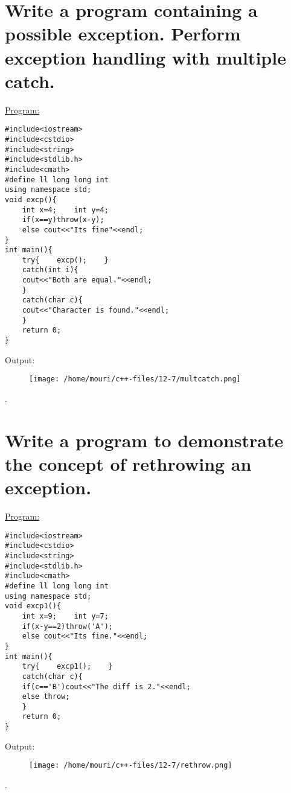 \documentclass[a4paper,11pt]{article}
\begin{document}
\section{Write a program containing a possible exception. Perform exception handling with multiple catch.}
\underline{Program:}
\begin{lstlisting}[showstringspaces=false]
#include<iostream>
#include<cstdio>
#include<string>
#include<stdlib.h>
#include<cmath>
#define ll long long int
using namespace std;
void excp(){
    int x=4;    int y=4;
    if(x==y)throw(x-y);
    else cout<<"Its fine"<<endl;
}
int main(){
    try{	excp();    }
    catch(int i){
	cout<<"Both are equal."<<endl;
    }
    catch(char c){
	cout<<"Character is found."<<endl;
    }
    return 0;
}
\end{lstlisting}
Output:
\begin{figure}[H]
\centering
\texttt{[image: /home/mouri/c++-files/12-7/multcatch.png]}
\end{figure}
.
\\
\section{Write a program to demonstrate the concept of rethrowing an exception.}
\underline{Program:}
\begin{lstlisting}[showstringspaces=false]
#include<iostream>
#include<cstdio>
#include<string>
#include<stdlib.h>
#include<cmath>
#define ll long long int
using namespace std;
void excp1(){
    int x=9;    int y=7;
    if(x-y==2)throw('A');
    else cout<<"Its fine."<<endl;
}
int main(){
    try{	excp1();    }
    catch(char c){
	if(c=='B')cout<<"The diff is 2."<<endl;
	else throw;
    }
    return 0;
}
\end{lstlisting}
Output:
\begin{figure}[H]
\centering
\texttt{[image: /home/mouri/c++-files/12-7/rethrow.png]}
\end{figure}
.
\end{document}
